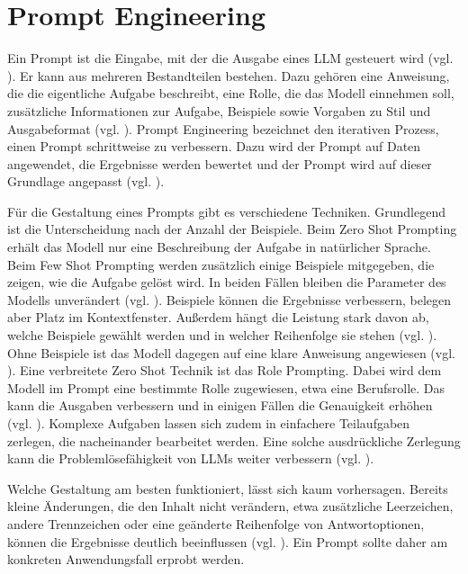 \section{Prompt Engineering}
\label{sec:promptengineering}

Ein Prompt ist die Eingabe, mit der die Ausgabe eines \ac{LLM} gesteuert wird (vgl. \cite[S.~5]{schulhoff2025promptreportsystematicsurvey}). Er kann aus mehreren Bestandteilen bestehen. Dazu gehören eine Anweisung, die die eigentliche Aufgabe beschreibt, eine Rolle, die das Modell einnehmen soll, zusätzliche Informationen zur Aufgabe, Beispiele sowie Vorgaben zu Stil und Ausgabeformat (vgl. \cite[S.~5~f.]{schulhoff2025promptreportsystematicsurvey}). Prompt Engineering bezeichnet den iterativen Prozess, einen Prompt schrittweise zu verbessern. Dazu wird der Prompt auf Daten angewendet, die Ergebnisse werden bewertet und der Prompt wird auf dieser Grundlage angepasst (vgl. \cite[S.~7]{schulhoff2025promptreportsystematicsurvey}).

Für die Gestaltung eines Prompts gibt es verschiedene Techniken. Grundlegend ist die Unterscheidung nach der Anzahl der Beispiele. Beim Zero Shot Prompting erhält das Modell nur eine Beschreibung der Aufgabe in natürlicher Sprache. Beim Few Shot Prompting werden zusätzlich einige Beispiele mitgegeben, die zeigen, wie die Aufgabe gelöst wird. In beiden Fällen bleiben die Parameter des Modells unverändert (vgl. \cite[S. 1879]{brown2020language}). Beispiele können die Ergebnisse verbessern, belegen aber Platz im Kontextfenster. Außerdem hängt die Leistung stark davon ab, welche Beispiele gewählt werden und in welcher Reihenfolge sie stehen (vgl. \cite[S.~10~f.]{schulhoff2025promptreportsystematicsurvey}). Ohne Beispiele ist das Modell dagegen auf eine klare Anweisung angewiesen (vgl. \cite[S.~11]{schulhoff2025promptreportsystematicsurvey}). Eine verbreitete Zero Shot Technik ist das Role Prompting. Dabei wird dem Modell im Prompt eine bestimmte Rolle zugewiesen, etwa eine Berufsrolle. Das kann die Ausgaben verbessern und in einigen Fällen die Genauigkeit erhöhen (vgl. \cite[S.~11]{schulhoff2025promptreportsystematicsurvey}). Komplexe Aufgaben lassen sich zudem in einfachere Teilaufgaben zerlegen, die nacheinander bearbeitet werden. Eine solche ausdrückliche Zerlegung kann die Problemlösefähigkeit von \acp{LLM} weiter verbessern (vgl. \cite[S.~13]{schulhoff2025promptreportsystematicsurvey}).

Welche Gestaltung am besten funktioniert, lässt sich kaum vorhersagen. Bereits kleine Änderungen, die den Inhalt nicht verändern, etwa zusätzliche Leerzeichen, andere Trennzeichen oder eine geänderte Reihenfolge von Antwortoptionen, können die Ergebnisse deutlich beeinflussen (vgl. \cite[S.~31]{schulhoff2025promptreportsystematicsurvey}). Ein Prompt sollte daher am konkreten Anwendungsfall erprobt werden.

